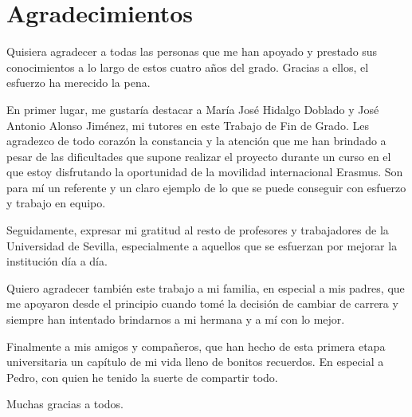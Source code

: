 \chapter*{Agradecimientos}

Quisiera agradecer a todas las personas que me han apoyado y prestado
sus conocimientos a lo largo de estos cuatro años del grado. Gracias a ellos, 
el esfuerzo ha merecido la pena.

En primer lugar, me gustaría destacar a María José Hidalgo Doblado y José 
Antonio Alonso Jiménez, mi tutores en este Trabajo de Fin de Grado. Les
agradezco de todo corazón la constancia y la atención que me han brindado 
a pesar de las dificultades que supone realizar el proyecto durante un
curso en el que estoy disfrutando la oportunidad de la movilidad internacional
Erasmus. Son para mí un referente y un claro ejemplo de lo que se puede 
conseguir con esfuerzo y trabajo en equipo.

Seguidamente, expresar mi gratitud al resto de profesores y trabajadores
de la Universidad de Sevilla, especialmente a aquellos que se esfuerzan 
por mejorar la institución día a día.

Quiero agradecer también este trabajo a mi familia, en especial a mis padres,
que me apoyaron desde el principio cuando tomé la decisión de cambiar de
carrera y siempre han intentado brindarnos a mi hermana y a mí con lo mejor.

Finalmente a mis amigos y compañeros, que han hecho de esta primera etapa 
universitaria un capítulo de mi vida lleno de bonitos recuerdos. En especial
a Pedro, con quien he tenido la suerte de compartir todo.

Muchas gracias a todos.
